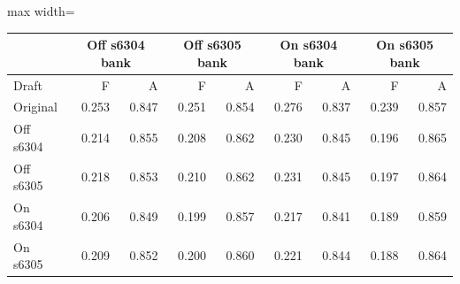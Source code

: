 \scriptsize
\setlength{\tabcolsep}{3.5pt}
\label{tab:t3studentbanks}
\begin{adjustbox}{max width=\linewidth}
\begin{tabular}{lrrrrrrrr}
\toprule
 & \multicolumn{2}{c}{Off s6304 bank} & \multicolumn{2}{c}{Off s6305 bank} & \multicolumn{2}{c}{On s6304 bank} & \multicolumn{2}{c}{On s6305 bank} \\
\midrule
Draft & F & A & F & A & F & A & F & A \\
\midrule
Original & 0.253 & 0.847 & 0.251 & 0.854 & 0.276 & 0.837 & 0.239 & 0.857 \\
Off s6304 & 0.214 & 0.855 & 0.208 & 0.862 & 0.230 & 0.845 & 0.196 & 0.865 \\
Off s6305 & 0.218 & 0.853 & 0.210 & 0.862 & 0.231 & 0.845 & 0.197 & 0.864 \\
On s6304 & 0.206 & 0.849 & 0.199 & 0.857 & 0.217 & 0.841 & 0.189 & 0.859 \\
On s6305 & 0.209 & 0.852 & 0.200 & 0.860 & 0.221 & 0.844 & 0.188 & 0.864 \\
\bottomrule
\end{tabular}
\end{adjustbox}
